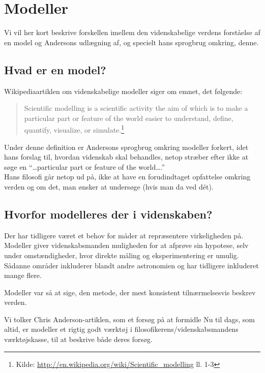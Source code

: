 \section{Modeller}
Vi vil her kort beskrive forskellen imellem den videnskabelige verdens
forståelse af en model og Andersons udlægning af, og specielt hans sprogbrug
omkring, denne.

\subsection{Hvad er en model?}
Wikipediaartiklen om videnskabelige modeller siger om emnet, det følgende:
\begin{quote}
Scientific modelling is a scientific activity the aim of which is to make a
particular part or feature of the world easier to understand, define, quantify, visualize, or simulate.\footnote{Kilde: {\url{http://en.wikipedia.org/wiki/Scientific_modelling}} ll. 1-3}
\end{quote}

Under denne definition er Andersons sprogbrug omkring modeller forkert, idet
hans forslag til, hvordan videnskab skal behandles, netop stræber efter ikke at
søge en ``\ldots particular part or feature of the world\ldots.''\\
Hans filosofi går netop ud på, ikke at have en forudindtaget opfattelse omkring
verden og om det, man ønsker at undersøge (hvis man da ved dét).

\subsection{Hvorfor modelleres der i videnskaben?}
Der har tidligere været et behov for måder at repræsentere virkeligheden på.
Modeller giver videnskabsmanden muligheden for at afprøve sin hypotese, selv
under omstændigheder, hvor direkte måling og eksperimentering er umulig.\\
Sådanne områder inkluderer blandt andre astronomien og har tidligere inkluderet
mange flere.

Modeller var så at sige, den metode, der mest konsistent tilnærmelsesvis beskrev
verden.

Vi tolker Chris Anderson-artiklen, som et forsøg på at formidle 
Nu til dags, som altid, er modeller et rigtig godt værktøj i
filosofikerens/videnskabsmandens værktøjskasse, til at beskrive både deres
forsøg.

